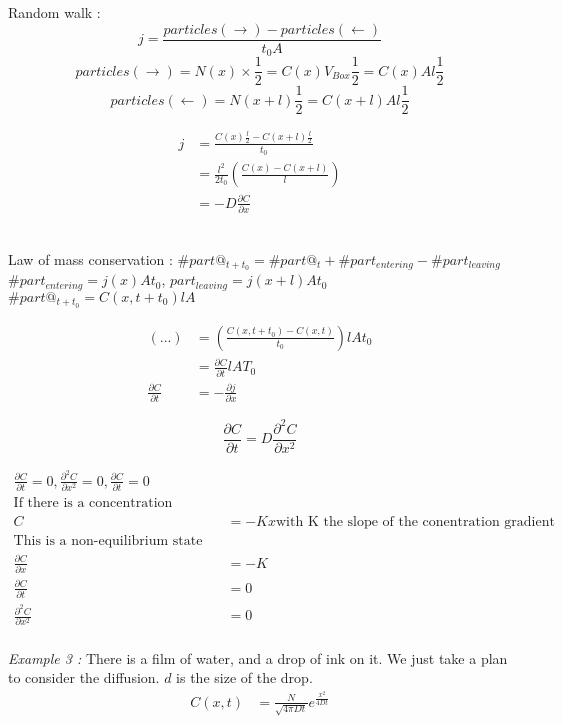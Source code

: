 \documentclass[10pt,a4paper]{article}
\begin{document}
Random walk :
\[ j = \frac{particles(\rightarrow)-particles(\leftarrow)}{t_0 A} \]
\[ particles(\rightarrow) = N(x)\times \frac{1}{2} = C(x)V_{Box}\frac{1}{2} = C(x)Al\frac{1}{2} \]
\[ particles (\leftarrow) = N(x+l)\frac{1}{2} = C(x+l)Al\frac{1}{2} \]


\begin{align*}
    j &= \frac{C(x)\frac{l}{2} - C(x+l)\frac{l}{2}}{t_0}\\
    &= \frac{l^2}{2t_0}\left( \frac{C(x) - C(x+l)}{l} \right)\\
    &= -D\frac{\partial C}{\partial x}
\end{align*}

~\\
Law of mass conservation : $\#part@_{t+t_0} = \#part@_t + \#part_{entering} - \#part_{leaving}$\\
$\#part_{entering} = j(x)At_0$, $part_{leaving} = j(x+l)At_0$\\
$\#part@_{t+t_0} = C(x,t+t_0)lA$

\begin{align*}
(...) &= \left( \frac{C(x,t+t_0) - C(x,t)}{t_0} \right) lAt_0\\
&= \frac{\partial C}{\partial t}lAT_0\\
\frac{\partial C}{\partial t} &= -\frac{\partial j}{\partial x}
\end{align*}

\[ \frac{\partial C}{\partial t} = D\frac{\partial^2C}{\partial x^2} \]


\begin{align*}
\frac{\partial C}{\partial t} = 0,\frac{\partial^2 C}{\partial x^2}=0, \frac{\partial C}{\partial t} =0\\
\text{If there is a concentration gradient :}\\
C &= -Kx \text{with K the slope of the conentration gradient}\\
\text{This is a non-equilibrium state}\\
\frac{\partial C}{\partial x} &= -K\\
\frac{\partial C}{\partial t} &= 0\\
\frac{\partial ^2 C}{\partial x^2} &= 0\\
\end{align*}

\emph{Example 3 :} There is a film of water, and a drop of ink on it. We just take a plan to consider the diffusion. $d$ is the size of the drop.
\begin{align*}
    C(x,t) &= \frac{N}{\sqrt{4 \pi Dt}} e^{\frac{x^2}{4Dt}}
\end{align*}
\end{document}
